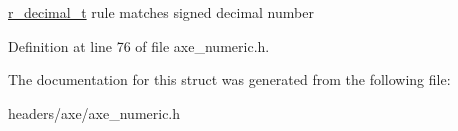 \hyperlink{structaxe_1_1r__decimal__t}{r\+\_\+decimal\+\_\+t} rule matches signed decimal number 

Definition at line 76 of file axe\+\_\+numeric.\+h.



The documentation for this struct was generated from the following file\+:\begin{DoxyCompactItemize}
\item 
headers/axe/axe\+\_\+numeric.\+h\end{DoxyCompactItemize}
